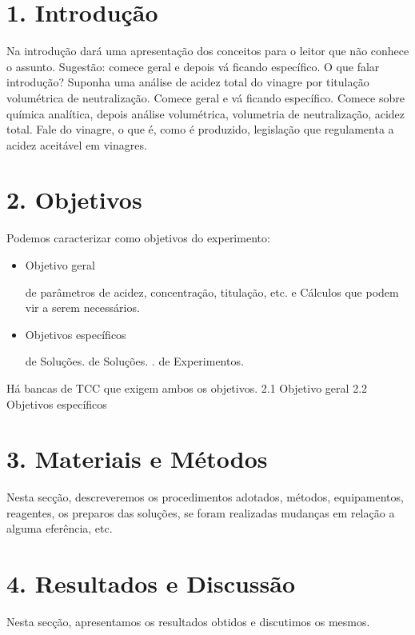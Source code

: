 \documentclass{article}%
\begin{document}
%
\normalsize%
\section{1. Introdução}%
\label{sec:1.Introduo}%

    Na introdução dará uma apresentação dos conceitos para o leitor que não conhece
    o assunto.       
    Sugestão: comece geral e depois vá ficando específico.       
    O que falar introdução? Suponha uma análise de acidez total do vinagre por       
    titulação volumétrica de neutralização. Comece geral e vá ficando específico. Comece       
    sobre química analítica, depois análise volumétrica, volumetria de neutralização, acidez       
    total. Fale do vinagre, o que é, como é produzido, legislação que regulamenta a acidez       
    aceitável em vinagres.
    

%
\section{2. Objetivos}%
\label{sec:2.Objetivos}%

        Podemos caracterizar como objetivos do experimento:
        \begin{itemize}
        \item Objetivo geral
            \begin{itemize}
             de parâmetros de acidez, concentração, titulação, etc.
            \Dimensionamentos e Cálculos que podem vir a serem necessários.
            \end{itemize}
            
        \item Objetivos específicos
            \begin{itemize}
            \Preparo de Soluções.
             de Soluções.
            .
            \Planejamento de Experimentos.
            \end{itemize}
        \end{itemize}
        
        Há bancas de TCC que exigem ambos os objetivos.
2.1 Objetivo geral%
2.2 Objetivos específicos

%
\section{3. Materiais e Métodos}%
\label{sec:3.MateriaiseMtodos}%

        Nesta secção, descreveremos os procedimentos adotados, métodos, equipamentos, reagentes, os preparos
        das soluções, se foram realizadas mudanças em relação a alguma eferência, etc.
        

%
\section{4. Resultados e Discussão}%
\label{sec:4.ResultadoseDiscusso}%

        Nesta secção, apresentamos os resultados obtidos e discutimos os mesmos.
        

%
\end{document}
